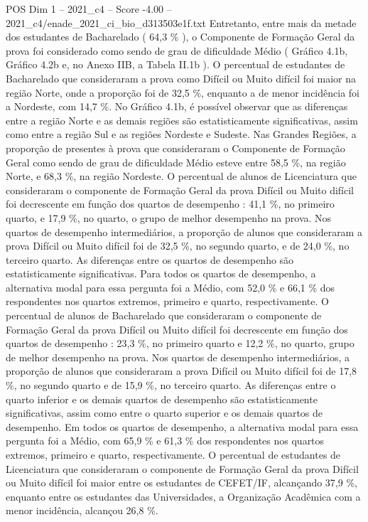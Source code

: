 \begin{textsample}{POS Dim 1 – 2021\_c4 – Score -4.00 – 2021\_c4/enade\_2021\_ci\_bio\_d313503e1f.txt}
Entretanto, entre mais da metade dos estudantes de Bacharelado ( 64,3 \% ), o Componente de Formação Geral da prova foi considerado como sendo de grau de dificuldade Médio ( Gráfico 4.1b, Gráfico 4.2b e, no Anexo IIB, a Tabela II.1b ).
O percentual de estudantes de Bacharelado que consideraram a prova como Difícil ou Muito difícil foi maior na região Norte, onde a proporção foi de 32,5 \%, enquanto a de menor incidência foi a Nordeste, com 14,7 \%.
No Gráfico 4.1b, é possível observar que as diferenças entre a região Norte e as demais regiões são estatisticamente significativas, assim como entre a região Sul e as regiões Nordeste e Sudeste.
Nas Grandes Regiões, a proporção de presentes à prova que consideraram o Componente de Formação Geral como sendo de grau de dificuldade Médio esteve entre 58,5 \%, na região Norte, e 68,3 \%, na região Nordeste.
O percentual de alunos de Licenciatura que consideraram o componente de Formação Geral da prova Difícil ou Muito difícil foi decrescente em função dos quartos de desempenho : 41,1 \%, no primeiro quarto, e 17,9 \%, no quarto, o grupo de melhor desempenho na prova.
Nos quartos de desempenho intermediários, a proporção de alunos que consideraram a prova Difícil ou Muito difícil foi de 32,5 \%, no segundo quarto, e de 24,0 \%, no terceiro quarto.
As diferenças entre os quartos de desempenho são estatisticamente significativas.
Para todos os quartos de desempenho, a alternativa modal para essa pergunta foi a Médio, com 52,0 \% e 66,1 \% dos respondentes nos quartos extremos, primeiro e quarto, respectivamente.
O percentual de alunos de Bacharelado que consideraram o componente de Formação Geral da prova Difícil ou Muito difícil foi decrescente em função dos quartos de desempenho : 23,3 \%, no primeiro quarto e 12,2 \%, no quarto, grupo de melhor desempenho na prova.
Nos quartos de desempenho intermediários, a proporção de alunos que consideraram a prova Difícil ou Muito difícil foi de 17,8 \%, no segundo quarto e de 15,9 \%, no terceiro quarto.
As diferenças entre o quarto inferior e os demais quartos de desempenho são estatisticamente significativas, assim como entre o quarto superior e os demais quartos de desempenho.
Em todos os quartos de desempenho, a alternativa modal para essa pergunta foi a Médio, com 65,9 \% e 61,3 \% dos respondentes nos quartos extremos, primeiro e quarto, respectivamente.
O percentual de estudantes de Licenciatura que consideraram o componente de Formação Geral da prova Difícil ou Muito difícil foi maior entre os estudantes de CEFET/IF, alcançando 37,9 \%, enquanto entre os estudantes das Universidades, a Organização Acadêmica com a menor incidência, alcançou 26,8 \%.

\end{textsample}
